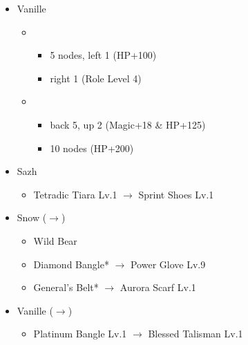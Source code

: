 \begin{menu}
\begin{itemize}
\begin{itemize}
\begin{itemize}
\begin{itemize}
						\end{itemize}
				\end{itemize}
			\item Vanille
				\begin{itemize}
					\item \sab
						\begin{itemize}
							\item 5 nodes, left 1 (HP+100)
							\item right 1 (Role Level 4)
						\end{itemize}
					\item \med
						\begin{itemize}
							\item back 5, up 2 (Magic+18 \& HP+125)
							\item 10 nodes (HP+200)
						\end{itemize}
				\end{itemize}
		\end{itemize}
	\equip
		\begin{itemize}
			\item Sazh
				\begin{itemize}
					\item Tetradic Tiara Lv.1 $\rightarrow$ Sprint Shoes Lv.1
				\end{itemize}			
			\item Snow ($\rightarrow$)
				\begin{itemize}
					\item Wild Bear
					\item Diamond Bangle* $\rightarrow$ Power Glove Lv.9
					\item General's Belt* $\rightarrow$ Aurora Scarf Lv.1
				\end{itemize}
			\item Vanille ($\rightarrow$)
				\begin{itemize}
					\item Platinum Bangle Lv.1 $\rightarrow$ Blessed Talisman Lv.1
				\end{itemize}				
		\end{itemize}
	\end{itemize}
\end{menu}

\renewcommand{\first}{[1] Tireless Charge (\com/\com/\med)}
\renewcommand{\second}{[2] Devastation (\com/\com/\sab)}
\renewcommand{\third}{[3] Premeditation (\syn/\sen/\sab)}
\renewcommand{\fourth}{[4] Tri-Disaster (\rav/\rav/\rav)}
\renewcommand{\fifth}{[5] Dirty Fighting (\com/\sen/\sab)}
\renewcommand{\sixth}{[6] Mystic Tower (\rav/\sen/\rav)}


